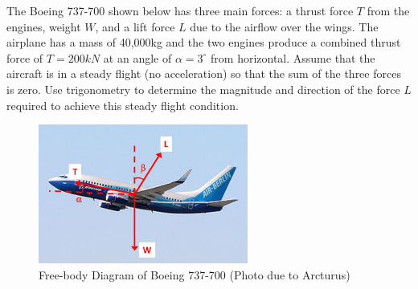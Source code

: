 
The Boeing 737-700 shown below has three main forces: a thrust force $T$ from the engines, weight $W$, and a lift force $L$ due to the airflow over the wings. The airplane has a mass of 40,000kg and the two engines produce a combined thrust force of $T = 200kN$ at an angle of $\alpha = 3^\circ$ from horizontal. Assume that the aircraft is in a steady flight (no acceleration) so that the sum of the three forces is zero. Use trigonometry to determine the magnitude and direction of the force $L$ required to achieve this steady flight condition.
\begin{figure}[ht!]
  \centering
  \includegraphics[height=1.8in]{boeing.jpg}
  \caption{Free-body Diagram of Boeing 737-700 (Photo due to Arcturus)}
\end{figure}

